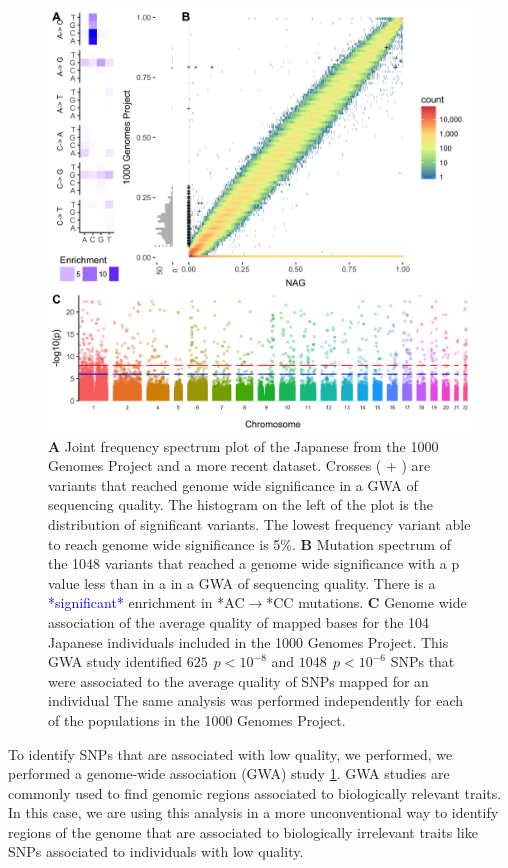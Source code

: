 \documentclass[9pt,lineno]{elife}
\newcommand{\todo}[1]{\textcolor{blue}{*#1*}}
\begin{document}
\begin{figure}
\includegraphics[width=\hsize,keepaspectratio]{Figure1.jpg}
\caption{
\textbf{A} 
Joint frequency spectrum plot of the Japanese from the 1000 Genomes Project and a more recent dataset.
Crosses ( + ) are variants that reached genome wide significance in a GWA of sequencing quality. 
The histogram on the left of the plot is the distribution of significant variants. 
The lowest frequency variant able to reach genome wide significance is 5\%.
\textbf{B} 
Mutation spectrum of the 1048 variants that reached a genome wide significance with a p value less than  in a in a GWA of sequencing quality. 
There is a \todo{significant} enrichment in *AC${\rightarrow}$*CC mutations. 
\textbf{C} 
Genome wide association of the average quality of mapped bases for the 104 Japanese individuals included in the 1000 Genomes Project. This GWA study identified $625\ \  p < 10^{-8}$ and $1048\ \ p < 10^{-6}$ SNPs that were associated to the average quality of SNPs mapped for an individual
The same analysis was performed independently for each of the populations in the 1000 Genomes Project. }
 \label{SFS}
\end{figure}

To identify SNPs that are associated with low quality, we performed, we performed a genome-wide association (GWA) study  \ref{SFS}. 
GWA studies are commonly used to find genomic regions associated to biologically relevant traits. In this case, we are using this analysis in a more unconventional way to identify regions of the genome that are associated to biologically irrelevant traits like SNPs associated to individuals with low quality.
 
\end{document}
